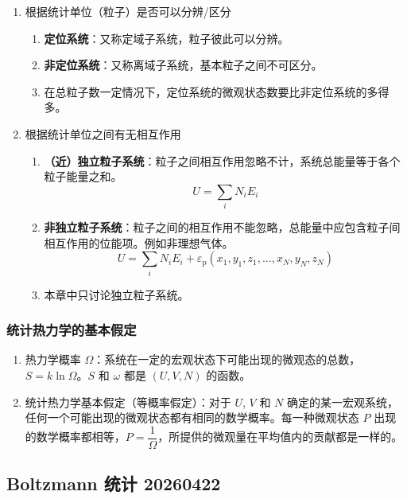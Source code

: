 \begin{enumerate}
    \item 根据统计单位（粒子）是否可以分辨/区分
    \begin{enumerate}
        \item \textbf{定位系统}：又称定域子系统，粒子彼此可以分辨。
        \item \textbf{非定位系统}：又称离域子系统，基本粒子之间不可区分。
        \item 在总粒子数一定情况下，定位系统的微观状态数要比非定位系统的多得多。
    \end{enumerate}
    \item 根据统计单位之间有无相互作用
    \begin{enumerate}
        \item \textbf{（近）独立粒子系统}：粒子之间相互作用忽略不计，系统总能量等于各个粒子能量之和。
        \begin{equation*}
            U = \sum_{i} N_i E_i
        \end{equation*}
        \item \textbf{非独立粒子系统}：粒子之间的相互作用不能忽略，总能量中应包含粒子间相互作用的位能项。例如非理想气体。
        \begin{equation*}
            U = \sum_{i} N_i E_i + \varepsilon_{\mathrm{p}}(x_1, y_1, z_1, ..., x_N, y_N, z_N)
        \end{equation*}
        \item 本章中只讨论独立粒子系统。
    \end{enumerate}
\end{enumerate}

\subsubsection{统计热力学的基本假定}

\begin{enumerate}
    \item 热力学概率 $\Omega$：系统在一定的宏观状态下可能出现的微观态的总数，$S = k \ln{\Omega}$。$S$ 和 $\omega$ 都是 $(U,V,N)$ 的函数。
    \item 统计热力学基本假定（等概率假定）：对于 $U$, $V$ 和 $N$ 确定的某一宏观系统，任何一个可能出现的微观状态都有相同的数学概率。每一种微观状态 $P$ 出现的数学概率都相等，$P = \dfrac1{\Omega}$，所提供的微观量在平均值内的贡献都是一样的。
\end{enumerate}

\subsection{Boltzmann 统计 20260422}

